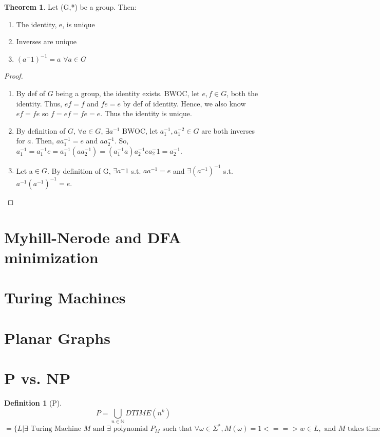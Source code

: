\documentclass{article}
\theoremstyle{definition}
\newtheorem{define}{Definition}[section]
\newtheorem{thm}{Theorem}[section]
\begin{document}
\begin{thm}
Let (G,*) be a group. Then:
	\begin{enumerate}
		\item The identity, e, is unique
		\item Inverses are unique
		\item $(a^-{1})^{-1}= a$ $\forall a \in G$
	\end{enumerate}
\end{thm}
\begin{proof}
	\begin{enumerate}
		\item By def of $G$ being a group, the identity exists. BWOC, let $e,f \in G$, both the identity. Thus, $ef=f$ and $fe=e$ by def of identity. Hence, we also know $ef=fe$ so $f=ef=fe=e$. Thus the identity is unique.
		\item By definition of $G$, $\forall a \in G$, $\exists a^{-1}$ BWOC, let $a_1^{-1}, a_1^{-2} \in G$ are both inverses for $a$. Then, $aa_1^{-1}=e$ and $aa_2^{-1}$. So, $a_1^{-1}=a_1^{-1}e=a_1^{-1}(aa_2^{-1})=(a_1^{-1}a)a_2^{-1}ea_2^-1=a_2^{-1}$.
		\item Let a$\in G$. By definition of G, $\exists a^-1$ s.t. $aa^{-1}=e$ and $\exists(a^{-1})^{-1}$ s.t. $a^{-1}(a^{-1})^{-1}=e$.
	\end{enumerate}
\end{proof}


\section{Myhill-Nerode and DFA minimization}

\section{Turing Machines}

\section{Planar Graphs}

\section{P vs. NP}

\begin{define}[P]
$$P = \bigcup_{n\in\mathbb{N}}DTIME(n^k)$$ $=\{L|\exists \text{ Turing Machine } M \text{ and } \exists \text{ polynomial } P_M \text{ such that } \forall \omega \in \Sigma^*, M(\omega)=1 <==> w\in L, \text{ and } M \text{ takes time } p(|\omega|)\}$
\end{define}
\end{document}
